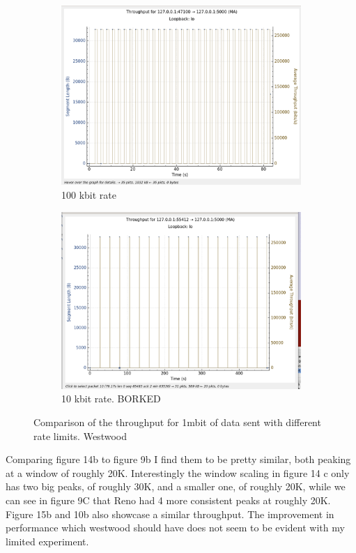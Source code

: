 \documentclass{report}
\begin{document}
\begin{figure}[H]
    \begin{subfigure}[b]{0.45\textwidth}
        \centering
        \includegraphics[width=\textwidth]{Pics/Westwood/r100kbit_s1m_th}
        \caption{100 kbit rate}
    \end{subfigure}
    \hfill
    \begin{subfigure}[b]{0.45\textwidth}
        \centering
        \includegraphics[width=\textwidth]{Pics/Westwood/r10kbit_s1m_th}
        \caption{10 kbit rate. BORKED}
    \end{subfigure}
    \caption{Comparison of the throughput for 1mbit of data sent with different rate limits. Westwood}
    \label{fig:four_images}
\end{figure}
Comparing figure 14b to figure 9b I  find them to be pretty similar, both peaking at a window of roughly 20K. Interestingly the window scaling in figure 14 c only has two big peaks, of roughly 30K, and a smaller one, of roughly 20K, while we can see in figure 9C that Reno had 4 more consistent peaks at roughly 20K.\\
Figure 15b and 10b also showcase a similar throughput. The improvement in performance which westwood should have does not seem to be evident with my limited experiment.
\end{document}
